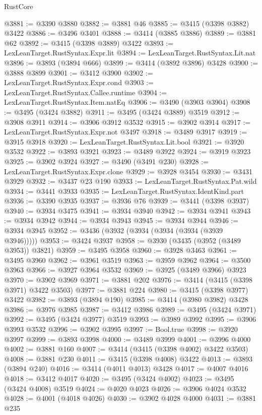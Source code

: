 \begin{lexlean}{RustCore}
\begin{coremodule}
@3881 := @3390 @3880
@3882 := @3881 @46
@3885 := @3415 (@3398 @3882) @3422
@3886 := @3496 @3401
@3888 := @3414 (@3885 @3886)
@3889 := @3881 @62
@3892 := @3415 (@3398 @3889) @3422
@3893 := LexLeanTarget.RustSyntax.Expr.lit
@3894 := LexLeanTarget.RustSyntax.Lit.nat
@3896 := @3893 (@3894 @666)
@3899 := @3414 (@3892 @3896) @3428
@3900 := @3888 @3899
@3901 := @3412 @3900
@3902 := LexLeanTarget.RustSyntax.Expr.cond
@3903 := LexLeanTarget.RustSyntax.Callee.runtime
@3904 := LexLeanTarget.RustSyntax.Item.natEq
@3906 := @3490 (@3903 @3904)
@3908 := @3495 (@3424 @3882)
@3911 := @3495 (@3424 @3889) @3519
@3912 := @3908 @3911
@3914 := @3906 @3912 @3532
@3915 := @3902 @3914
@3917 := LexLeanTarget.RustSyntax.Expr.not @3497
@3918 := @3489 @3917
@3919 := @3915 @3918
@3920 := LexLeanTarget.RustSyntax.Lit.bool
@3921 := @3920 @3532
@3922 := @3893 @3921
@3923 := @3489 @3922
@3924 := @3919 @3923
@3925 := @3902 @3924
@3927 := @3490 (@3491 @230)
@3928 := LexLeanTarget.RustSyntax.Expr.clone
@3929 := @3928 @3454
@3930 := @3431 @3929
@3932 := @3437 @23 @190
@3933 := LexLeanTarget.RustSyntax.Pat.wild
@3934 := @3441 @3933
@3935 := LexLeanTarget.RustSyntax.IdentKind.part
@3936 := @3390 @3935
@3937 := @3936 @76
@3939 := @3441 (@3398 @3937)
@3940 := @3934 @3475
@3941 := @3934 @3940
@3942 := @3934 @3941
@3943 := @3934 @3942
@3944 := @3934 @3943
@3945 := @3934 @3944
@3946 := @3934 @3945
@3952 := @3436 (@3932 (@3934 (@3934 (@3934 (@3939 @3946)))))
@3953 := @3424 @3937
@3958 := @3930 (@3435 (@3952 (@3489 @3953)) @3821)
@3959 := @3495 @3958
@3960 := @3928 @3463
@3961 := @3495 @3960
@3962 := @3961 @3519
@3963 := @3959 @3962
@3964 := @3500 @3963
@3966 := @3927 @3964 @3532
@3969 := @3925 (@3489 @3966) @3923
@3970 := @3902 @3969
@3971 := @3881 @202
@3976 := @3414 (@3415 (@3398 @3971) @3422 @3503)
@3977 := @3881 @224
@3980 := @3415 (@3398 @3977) @3422
@3982 := @3893 (@3894 @190)
@3985 := @3414 (@3980 @3982) @3428
@3986 := @3976 @3985
@3987 := @3412 @3986
@3989 := @3495 (@3424 @3971)
@3992 := @3495 (@3424 @3977) @3519
@3993 := @3989 @3992
@3995 := @3906 @3993 @3532
@3996 := @3902 @3995
@3997 := Bool.true
@3998 := @3920 @3997
@3999 := @3893 @3998
@4000 := @3489 @3999
@4001 := @3996 @4000
@4002 := @3881 @160
@4007 := @3414 (@3415 (@3398 @4002) @3422 @3503)
@4008 := @3881 @230
@4011 := @3415 (@3398 @4008) @3422
@4013 := @3893 (@3894 @240)
@4016 := @3414 (@4011 @4013) @3428
@4017 := @4007 @4016
@4018 := @3412 @4017
@4020 := @3495 (@3424 @4002)
@4023 := @3495 (@3424 @4008) @3519
@4024 := @4020 @4023
@4026 := @3906 @4024 @3532
@4028 := @4001 (@4018 @4026)
@4030 := @3902 @4028 @4000
@4031 := @3881 @235

\end{coremodule}
\end{lexlean}
